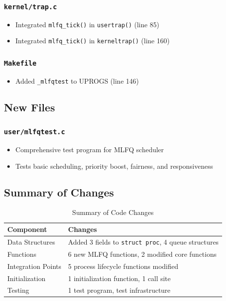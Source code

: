 \documentclass[11pt,a4paper]{article}
\begin{document}
\subsubsection{\texttt{kernel/trap.c}}
\begin{itemize}
    \item Integrated \texttt{mlfq\_tick()} in \texttt{usertrap()} (line 85)
    \item Integrated \texttt{mlfq\_tick()} in \texttt{kerneltrap()} (line 160)
\end{itemize}

\subsubsection{\texttt{Makefile}}
\begin{itemize}
    \item Added \texttt{\_mlfqtest} to UPROGS (line 146)
\end{itemize}

\subsection{New Files}

\subsubsection{\texttt{user/mlfqtest.c}}
\begin{itemize}
    \item Comprehensive test program for MLFQ scheduler
    \item Tests basic scheduling, priority boost, fairness, and responsiveness
\end{itemize}

\subsection{Summary of Changes}

\begin{table}[h]
\centering
\begin{tabular}{@{}ll@{}}
\toprule
\textbf{Component} & \textbf{Changes} \\
\midrule
Data Structures & Added 3 fields to \texttt{struct proc}, 4 queue structures \\
Functions & 6 new MLFQ functions, 2 modified core functions \\
Integration Points & 5 process lifecycle functions modified \\
Initialization & 1 initialization function, 1 call site \\
Testing & 1 test program, test infrastructure \\
\bottomrule
\end{tabular}
\caption{Summary of Code Changes}
\end{table}
\end{document}

